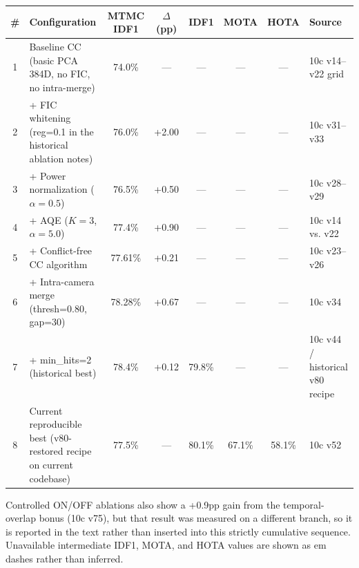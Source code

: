 \begingroup
\scriptsize
\setlength{\tabcolsep}{4pt}
\begin{tabularx}{\textwidth}{c X c c c c c l}
\toprule
\# & Configuration & MTMC IDF1 & $\Delta$ (pp) & IDF1 & MOTA & HOTA & Source \\
\midrule
1 & Baseline CC (basic PCA 384D, no FIC, no intra-merge) & 74.0\% & --- & --- & --- & --- & 10c v14--v22 grid \\
2 & + FIC whitening (reg=0.1 in the historical ablation notes) & 76.0\% & +2.00 & --- & --- & --- & 10c v31--v33 \\
3 & + Power normalization ($\alpha=0.5$) & 76.5\% & +0.50 & --- & --- & --- & 10c v28--v29 \\
4 & + AQE ($K=3$, $\alpha=5.0$) & 77.4\% & +0.90 & --- & --- & --- & 10c v14 vs. v22 \\
5 & + Conflict-free CC algorithm & 77.61\% & +0.21 & --- & --- & --- & 10c v23--v26 \\
6 & + Intra-camera merge (thresh=0.80, gap=30) & 78.28\% & +0.67 & --- & --- & --- & 10c v34 \\
7 & + min\_hits=2 (historical best) & 78.4\% & +0.12 & 79.8\% & --- & --- & 10c v44 / historical v80 recipe \\
8 & Current reproducible best (v80-restored recipe on current codebase) & 77.5\% & --- & 80.1\% & 67.1\% & 58.1\% & 10c v52 \\
\bottomrule
\end{tabularx}

\vspace{0.4em}
\par\noindent\footnotesize Controlled ON/OFF ablations also show a +0.9pp gain from the temporal-overlap bonus (10c v75), but that result was measured on a different branch, so it is reported in the text rather than inserted into this strictly cumulative sequence. Unavailable intermediate IDF1, MOTA, and HOTA values are shown as em dashes rather than inferred.
\endgroup